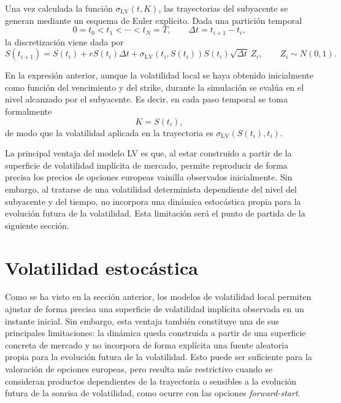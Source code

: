 Una vez calculada la función \(\sigma_{\mathrm{LV}}(t,K)\), las trayectorias del subyacente se generan mediante un esquema de Euler explícito. Dada una partición temporal
\[
0=t_0<t_1<\cdots<t_N=T,
\qquad \Delta t=t_{i+1}-t_i,
\]
la discretización viene dada por
\begin{equation}
\label{eq:euler_local_vol}
S(t_{i+1})
=
S(t_i)
+
rS(t_i)\Delta t
+
\sigma_{\mathrm{LV}}(t_i,S(t_i))S(t_i)\sqrt{\Delta t}\,Z_i,
\qquad
Z_i\sim N(0,1).
\end{equation}

En la expresión anterior, aunque la volatilidad local se haya obtenido inicialmente como función del vencimiento y del strike, durante la simulación se evalúa en el nivel alcanzado por el subyacente. Es decir, en cada paso temporal se toma formalmente
\[
K=S(t_i),
\]
de modo que la volatilidad aplicada en la trayectoria es \(\sigma_{\mathrm{LV}}(S(t_i),t_i)\).\medskip

La principal ventaja del modelo LV es que, al estar construido a partir de la superficie de volatilidad implícita de mercado, permite reproducir de forma precisa los precios de opciones europeas vainilla observados inicialmente. Sin embargo, al tratarse de una volatilidad determinista dependiente del nivel del subyacente y del tiempo, no incorpora una dinámica estocástica propia para la evolución futura de la volatilidad. Esta limitación será el punto de partida de la siguiente sección.
\section{Volatilidad estocástica}

Como se ha visto en la sección anterior, los modelos de volatilidad local permiten ajustar de forma precisa una superficie de volatilidad implícita observada en un instante inicial. Sin embargo, esta ventaja también constituye una de sus principales limitaciones: la dinámica queda construida a partir de una superficie concreta de mercado y no incorpora de forma explícita una fuente aleatoria propia para la evolución futura de la volatilidad. Esto puede ser suficiente para la valoración de opciones europeas, pero resulta más restrictivo cuando se consideran productos dependientes de la trayectoria o sensibles a la evolución futura de la sonrisa de volatilidad, como ocurre con las opciones \textit{forward-start}. \medskip

